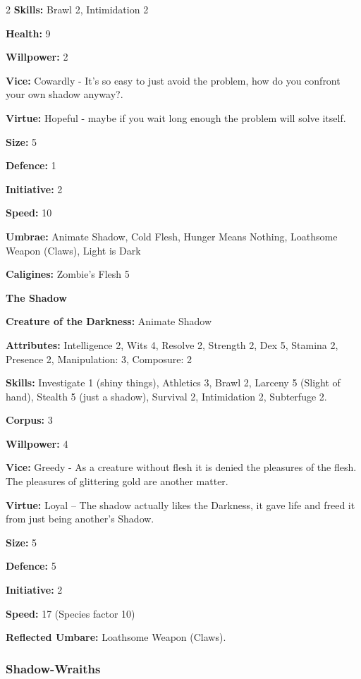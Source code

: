\begin{multicols}{2}
\noindent \textbf{Skills:} Brawl 2, Intimidation 2

\noindent \textbf{Health:} 9

\noindent \textbf{Willpower:} 2

\noindent \textbf{Vice:} Cowardly - It's so easy to just avoid the problem, how do you confront your own shadow anyway?.

\noindent \textbf{Virtue:} Hopeful - maybe if you wait long enough the problem will solve itself.

\noindent \textbf{Size:} 5

\noindent \textbf{Defence:} 1

\noindent \textbf{Initiative:} 2

\noindent \textbf{Speed:} 10

\noindent \textbf{Umbrae:} Animate Shadow, Cold Flesh, Hunger Means Nothing, Loathsome Weapon (Claws), Light is Dark

\noindent \textbf{Caligines:} Zombie's Flesh 5

\noindent \textbf{The Shadow}

\noindent \textbf{Creature of the Darkness:} Animate Shadow

\noindent \textbf{Attributes:} Intelligence 2, Wits 4, Resolve 2, Strength 2, Dex 5, Stamina 2, Presence 2, Manipulation: 3, Composure: 2

\noindent \textbf{Skills:} Investigate 1 (shiny things), Athletics 3, Brawl 2, Larceny 5 (Slight of hand), Stealth 5 (just a shadow), Survival 2, Intimidation 2, Subterfuge 2.

\noindent \textbf{Corpus:} 3

\noindent \textbf{Willpower:} 4

\noindent \textbf{Vice:} Greedy - As a creature without flesh it is denied the pleasures of the flesh. The pleasures of glittering gold are another matter.

\noindent \textbf{Virtue:} Loyal – The shadow actually likes the Darkness, it gave life and freed it from just being another's Shadow.

\noindent \textbf{Size:} 5

\noindent \textbf{Defence:} 5

\noindent \textbf{Initiative:} 2

\noindent \textbf{Speed:} 17 (Species factor 10)

\noindent \textbf{Reflected Umbare:} Loathsome Weapon (Claws).

\subsubsection*{Shadow-Wraiths}


\end{multicols}
